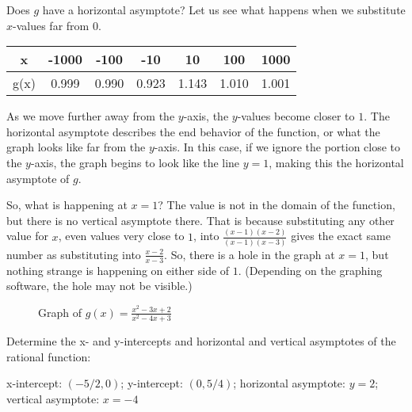 Does \( g \) have a horizontal asymptote? Let us see what happens when we substitute \( x \)-values far from \( 0 \).

\begin{center}
\begin{tabular}{ |c|c|c|c|c|c|c| } 
 \hline
 x & -1000 & -100 & -10 & 10 & 100 & 1000 \\ 
 \hline
 g(x) & 0.999 & 0.990 & 0.923 & 1.143 & 1.010 & 1.001 \\ 
 \hline
\end{tabular}
\end{center}

As we move further away from the \( y \)-axis, the \( y \)-values become closer to \( 1 \). The horizontal asymptote describes the end behavior of the function, or what the graph looks like far from the \( y \)-axis. In this case, if we ignore the portion close to the \( y \)-axis, the graph begins to look like the line \( y = 1 \), making this the horizontal asymptote of \( g \). 

So, what is happening at \( x = 1 \)? The value is not in the domain of the function, but there is no vertical asymptote there. That is because substituting any other value for \( x \), even values very close to \( 1 \), into \( \frac{(x - 1)(x - 2)}{(x - 1)(x - 3)} \) gives the exact same number as substituting into \( \frac{x-2}{x-3} \). So, there is a hole in the graph at \( x = 1 \), but nothing strange is happening on either side of \( 1 \). (Depending on the graphing software, the hole may not be visible.)

\begin{figure}[htbp]
  \centering
  \caption{Graph of \( g(x) = \frac{x^2 - 3x + 2}{x^2 - 4x + 3} \)}
\end{figure}

\begin{Exercise}[title=Rational Functions Practice 1, label=ratfunc1]
  Determine the x- and y-intercepts and horizontal and vertical asymptotes of the rational function:
  \vspace{40mm}
\end{Exercise}
\begin{Answer}[ref=ratfunc1]
x-intercept: $(-5/2, 0)$; y-intercept: $(0, 5/4)$; horizontal asymptote: $y = 2$; vertical asymptote: $x = -4$
\end{Answer}


